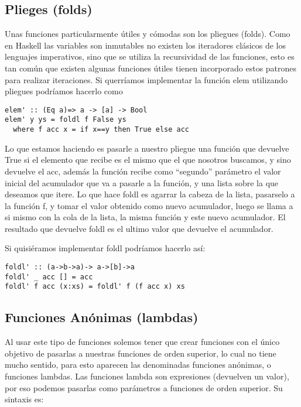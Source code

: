 
\subsection{Plieges (folds)} %
\label{sub:plieges_}

Unas funciones particularmente útiles y cómodas son los pliegues (folds).
Como en Haskell las variables son inmutables no existen los iteradores clásicos de los lenguajes imperativos, sino que se utiliza la recursividad de las funciones, esto es tan común que existen algunas funciones útiles tienen incorporado estos patrones para realizar iteraciones. Si querríamos implementar la función elem utilizando pliegues podríamos hacerlo como

\begin{lstlisting}
elem' :: (Eq a)=> a -> [a] -> Bool
elem' y ys = foldl f False ys
  where f acc x = if x==y then True else acc
\end{lstlisting}

Lo que estamos haciendo es pasarle a nuestro pliegue una función que devuelve True si el elemento que recibe es el mismo que el que nosotros buscamos, y sino devuelve el acc, además la función recibe como “segundo” parámetro el valor inicial del acumulador que va a pasarle a la función, y una lista sobre la que deseamos que itere. Lo que hace foldl es agarrar la cabeza de la lista, pasarselo a la función f, y tomar el valor obtenido como nuevo acumulador, luego se llama a si mismo con la cola de la lista, la misma función y este nuevo acumulador. El resultado que devuelve foldl es el ultimo valor que devuelve el acumulador.

Si quisiéramos implementar foldl podríamos hacerlo así:

\begin{lstlisting}
foldl' :: (a->b->a)-> a->[b]->a
foldl' _ acc [] = acc
foldl' f acc (x:xs) = foldl' f (f acc x) xs
\end{lstlisting}



\subsection{Funciones Anónimas (lambdas)} %
\label{sub:funciones_an_nimas_}


Al usar este tipo de funciones solemos tener que crear funciones con el único objetivo de pasarlas a nuestras funciones de orden superior, lo cual no tiene mucho sentido, para esto aparecen las denominadas funciones anónimas, o funciones lambdas. Las funciones lambda son expresiones (devuelven un valor), por eso podemos pasarlas como parámetros a funciones de orden superior.
Su sintaxis es:

